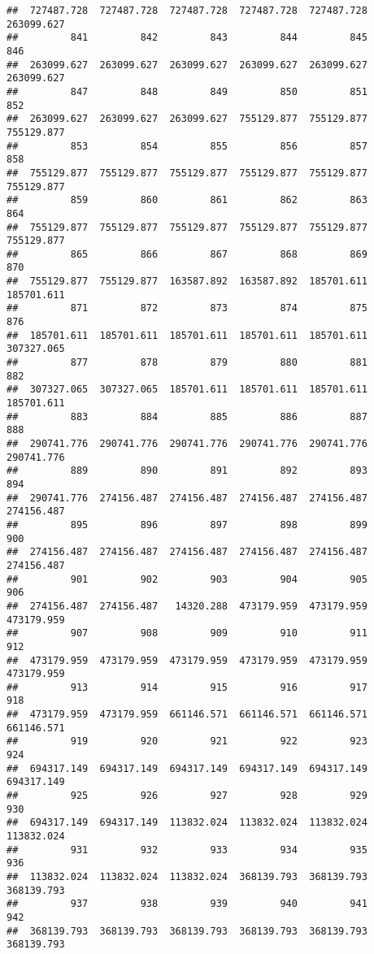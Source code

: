 \documentclass[
]{book}
\begin{document}
\begin{verbatim}
##  727487.728  727487.728  727487.728  727487.728  727487.728  263099.627 
##         841         842         843         844         845         846 
##  263099.627  263099.627  263099.627  263099.627  263099.627  263099.627 
##         847         848         849         850         851         852 
##  263099.627  263099.627  263099.627  755129.877  755129.877  755129.877 
##         853         854         855         856         857         858 
##  755129.877  755129.877  755129.877  755129.877  755129.877  755129.877 
##         859         860         861         862         863         864 
##  755129.877  755129.877  755129.877  755129.877  755129.877  755129.877 
##         865         866         867         868         869         870 
##  755129.877  755129.877  163587.892  163587.892  185701.611  185701.611 
##         871         872         873         874         875         876 
##  185701.611  185701.611  185701.611  185701.611  185701.611  307327.065 
##         877         878         879         880         881         882 
##  307327.065  307327.065  185701.611  185701.611  185701.611  185701.611 
##         883         884         885         886         887         888 
##  290741.776  290741.776  290741.776  290741.776  290741.776  290741.776 
##         889         890         891         892         893         894 
##  290741.776  274156.487  274156.487  274156.487  274156.487  274156.487 
##         895         896         897         898         899         900 
##  274156.487  274156.487  274156.487  274156.487  274156.487  274156.487 
##         901         902         903         904         905         906 
##  274156.487  274156.487   14320.288  473179.959  473179.959  473179.959 
##         907         908         909         910         911         912 
##  473179.959  473179.959  473179.959  473179.959  473179.959  473179.959 
##         913         914         915         916         917         918 
##  473179.959  473179.959  661146.571  661146.571  661146.571  661146.571 
##         919         920         921         922         923         924 
##  694317.149  694317.149  694317.149  694317.149  694317.149  694317.149 
##         925         926         927         928         929         930 
##  694317.149  694317.149  113832.024  113832.024  113832.024  113832.024 
##         931         932         933         934         935         936 
##  113832.024  113832.024  113832.024  368139.793  368139.793  368139.793 
##         937         938         939         940         941         942 
##  368139.793  368139.793  368139.793  368139.793  368139.793  368139.793 

\end{verbatim}
\end{document}
